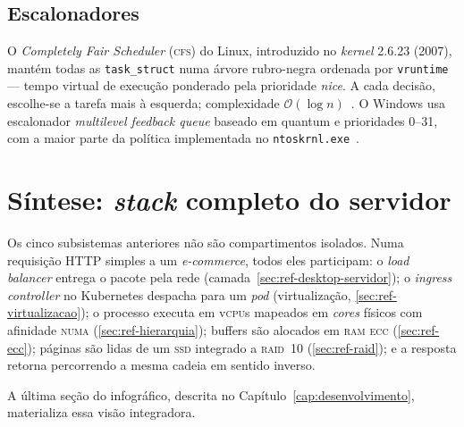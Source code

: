 \subsection{Escalonadores}

O \emph{Completely Fair Scheduler} (\textsc{cfs}) do Linux, introduzido
no \emph{kernel} 2.6.23 (2007), mantém todas as \texttt{task\_struct}
numa árvore rubro-negra ordenada por \texttt{vruntime} --- tempo
virtual de execução ponderado pela prioridade \emph{nice}. A cada
decisão, escolhe-se a tarefa mais à esquerda; complexidade
$\mathcal{O}(\log n)$~\cite{love2010}. O
Windows usa escalonador \emph{multilevel feedback queue} baseado em
quantum e prioridades 0--31, com a maior parte da política
implementada no \texttt{ntoskrnl.exe}~\cite{russinovich2017}.

\section{Síntese: \textit{stack} completo do servidor}
\label{sec:ref-stack}

Os cinco subsistemas anteriores não são compartimentos isolados.
Numa requisição HTTP simples a um \textit{e-commerce}, todos eles
participam: o \textit{load balancer} entrega o pacote pela rede
(camada~\ref{sec:ref-desktop-servidor}); o \textit{ingress
controller} no Kubernetes despacha para um \emph{pod}
(virtualização, \ref{sec:ref-virtualizacao}); o processo executa em
v\textsc{cpu}s mapeados em \emph{cores} físicos com afinidade
\textsc{numa} (\ref{sec:ref-hierarquia}); buffers são alocados em
\textsc{ram} \textsc{ecc} (\ref{sec:ref-ecc}); páginas são lidas de
um \textsc{ssd} integrado a \textsc{raid}~10 (\ref{sec:ref-raid}); e
a resposta retorna percorrendo a mesma cadeia em sentido inverso.

A última seção do infográfico, descrita no
Capítulo~\ref{cap:desenvolvimento}, materializa essa visão
integradora.
